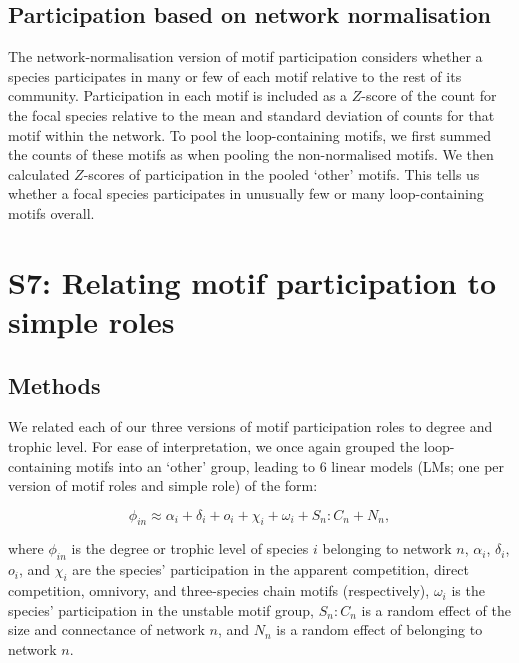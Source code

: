 \documentclass[12pt]{article}
\begin{document}
	\subsection*{Participation based on network normalisation}

		The network-normalisation version of motif participation considers whether a species participates in many or few of each motif relative to the rest of its community.
		Participation in each motif is included as a $Z$-score of the count for the focal species relative to the mean and standard deviation of counts for that motif within the network.
		To pool the loop-containing motifs, we first summed the counts of these motifs as when pooling the non-normalised motifs.
		We then calculated $Z$-scores of participation in the pooled `other' motifs.
		This tells us whether a focal species participates in unusually few or many loop-containing motifs overall.


\clearpage


\section*{S7: Relating motif participation to simple roles}

	\subsection*{Methods}

		We related each of our three versions of motif participation roles to degree and trophic level.
        For ease of interpretation, we once again grouped the loop-containing motifs into an `other' group, leading to 6 linear models (LMs; one per version of motif roles and simple role) of the form:

        \begin{equation}
            \phi_{in} \approx \alpha_{i} + \delta_{i} + o_{i} + \chi_{i} + \omega_{i} + S_{n}:C_{n} + N_n,
            \label{eq:degTL_motifs}
        \end{equation}

        \noindent where $\phi_{in}$ is the degree or trophic level of species $i$ belonging to network $n$, $\alpha_{i}$, $\delta_{i}$, $o_{i}$, and $\chi_{i}$ are the species' participation in the apparent competition, direct competition, omnivory, and three-species chain motifs (respectively), $\omega_{i}$ is the species' participation in the unstable motif group, $S_{n}:C_{n}$ is a random effect of the size and connectance of network $n$, and $N_n$ is a random effect of belonging to network $n$.
\end{document}
